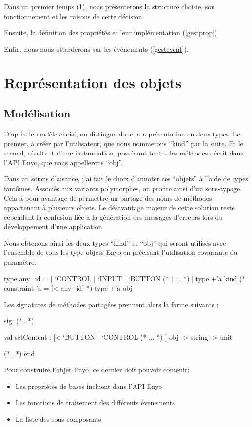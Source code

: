 Dans un premier temps (\ref{repobj}), nous présenterons la structure choisie, son fonctionnement et les raisons
de cette décision.

Ensuite, la définition des propriétés et leur implémentation (\ref{gestprop})

Enfin, nous nous attarderons sur les événements (\ref{gestevent}).

\section{Représentation des objets}\label{repobj}
\subsection{Modélisation}
D'après le modèle choisi, on distingue donc la représentation en deux types. Le premier,
à créer par l'utilisateur, que nous nommerons ``kind'' par la suite. Et le second,
résultant d'une instanciation, possédant toutes les méthodes décrit dans l'API Enyo, que
nous appellerons ``obj''.

Dans un soucis d'aisance, j'ai fait le choix d'annoter ces ``objets'' à l'aide de types fantômes.
Associés aux variants polymorphes, on profite ainsi d'un sous-typage.
Cela a pour avantage de permettre un partage des noms de méthodes appartenant à plusieurs objets. 
Le désavantage majeur de cette solution reste cependant la confusion liée 
à la génération des messages d'erreurs lors du développement d'une application.

Nous obtenons ainsi les deux types ``kind'' et ``obj'' qui seront utilisés avec l'ensemble de tous 
les type objets Enyo en précisant l'utilisation covariante du paramètre.
\begin{OCaml}
  type any_id = 
        [ `CONTROL | `INPUT | `BUTTON (* | ... *) ]
  type +'a kind (* constraint 'a = [< any_id] *)
  type +'a obj
\end{OCaml}
Les signatures de méthodes partagées prennent alors la forme suivante :
\begin{OCaml}
  sig:
  (*...*)
  
     val setContent : 
         [< `BUTTON | `CONTROL (* ... *) ] obj 
         -> string 
         -> unit
  
  (*...*)
  end
\end{OCaml}

Pour construire l'objet Enyo, ce dernier doit pouvoir contenir:
\begin{itemize}
\item Les propriétés de bases incluent dans l'API Enyo
\item Les fonctions de traitement des différents évenements
\item La liste des sous-composants
\end{itemize}

